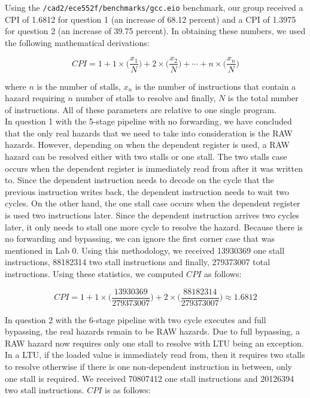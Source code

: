 \documentclass[12pt]{article}
\begin{document}
\begin{singlespace}

Using the \texttt{/cad2/ece552f/benchmarks/gcc.eio} benchmark, our group received a CPI of 1.6812 for question 1 (an increase of 68.12 percent) and a CPI of 1.3975 for question 2 (an increase of 39.75 percent). In obtaining these numbers, we used the following mathematical derivations:

$$
CPI = 1+1\times\Big(\frac{x_{1}}{N}\Big)+2\times\Big(\frac{x_{2}}{N}\Big)+\cdots+n\times\Big(\frac{x_{n}}{N}\Big)
$$

where $n$ is the number of stalls, $x_{n}$ is the number of instructions that contain a hazard requiring $n$ number of stalls to resolve and finally, $N$ is the total number of instructions. All of these parameters are relative to one single program.\\

In question 1 with the 5-stage pipeline with no forwarding, we have concluded that the only real hazards that we need to take into consideration is the RAW hazards. However, depending on when the dependent register is used, a RAW hazard can be resolved either with two stalls or one stall. The two stalls case occurs when the dependent register is immediately read from after it was written to. Since the dependent instruction needs to decode on the cycle that the previous instruction writes back, the dependent instruction needs to wait two cycles. On the other hand, the one stall case occurs when the dependent register is used two instructions later. Since the dependent instruction arrives two cycles later, it only needs to stall one more cycle to resolve the hazard. Because there is no forwarding and bypassing, we can ignore the first corner case that was mentioned in Lab 0. Using this methodology, we received 13930369 one stall instructions, 88182314 two stall instructions and finally, 279373007 total instructions. Using these statistics, we computed $CPI$ as follows:

$$
CPI = 1+1\times\Big(\frac{13930369}{279373007}\Big)+2\times\Big(\frac{88182314}{279373007}\Big)
    \approx 1.6812
$$

In question 2 with the 6-stage pipeline with two cycle executes and full bypassing, the real hazards remain to be RAW hazards. Due to full bypassing, a RAW hazard now requires only one stall to resolve with LTU being an exception. In a LTU, if the loaded value is immediately read from, then it requires two stalls to resolve otherwise if there is one non-dependent instruction in between, only one stall is required. We received 70807412 one stall instructions and 20126394 two stall instructions. $CPI$ is as follows:


\end{singlespace}
\end{document}
